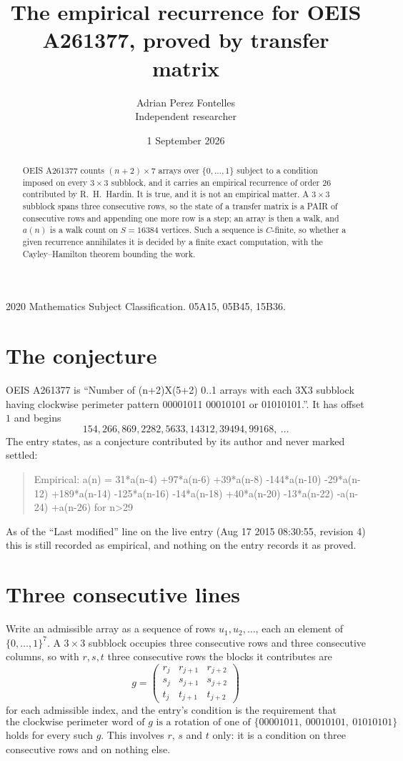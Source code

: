 \documentclass[11pt,a4paper]{article}
\title{The empirical recurrence for OEIS A261377, proved by transfer matrix}
\author{Adrian Perez Fontelles\\ \small Independent researcher}
\date{1 September 2026}
\theoremstyle{plain}
\theoremstyle{definition}
\begin{document}
\maketitle

\begin{abstract}
OEIS A261377 counts $(n+2)\times7$ arrays over $\{0,\dots,1\}$ subject to a condition imposed on
every $3\times3$ subblock, and it carries an empirical recurrence of order $26$
contributed by R.~H.~Hardin. It is true, and it is not an empirical matter. A $3\times3$
subblock spans three consecutive rows, so the state of a transfer matrix is a PAIR of
consecutive rows and appending one more row is a step; an array is then a walk, and
$a(n)$ is a walk count on $S=16384$ vertices. Such a sequence is $C$-finite, so whether a given
recurrence annihilates it is decided by a finite exact computation, with the Cayley--Hamilton
theorem bounding the work.
\end{abstract}

\noindent\small 2020 Mathematics Subject Classification. 05A15, 05B45, 15B36.\normalsize

\section{The conjecture}

OEIS A261377 is ``Number of (n+2)X(5+2) 0..1 arrays with each 3X3 subblock having clockwise perimeter pattern 00001011 00010101 or 01010101.''. It has offset $1$ and begins
\[
154, 266, 869, 2282, 5633, 14312, 39494, 99168,\ \dots
\]
The entry states, as a conjecture contributed by its author and never marked settled:
\begin{quote}
Empirical: a(n) = 31*a(n-4) +97*a(n-6) +39*a(n-8) -144*a(n-10) -29*a(n-12) +189*a(n-14) -125*a(n-16) -14*a(n-18) +40*a(n-20) -13*a(n-22) -a(n-24) +a(n-26) for n>29
\end{quote}
As of the ``Last modified'' line on the live entry (Aug 17 2015 08:30:55, revision 4) this is still
recorded as empirical, and nothing on the entry records it as proved.

\section{Three consecutive lines}

Write an admissible array as a sequence of rows $u_1,u_2,\dots$, each an element of
$\{0,\dots,1\}^{7}$. A $3\times3$ subblock occupies three consecutive rows and
three consecutive columns, so with $r,s,t$ three consecutive rows the blocks it
contributes are
\[
g=\begin{pmatrix}r_j&r_{j+1}&r_{j+2}\\ s_j&s_{j+1}&s_{j+2}\\ t_j&t_{j+1}&t_{j+2}\end{pmatrix}
\]
for each admissible index, and the entry's condition is the requirement that
\[
\text{the clockwise perimeter word of }g\text{ is a rotation of one of }\{00001011,\ 00010101,\ 01010101\}
\]
holds for every such $g$. This involves $r$, $s$ and $t$ only: it is a condition on
three consecutive rows and on nothing else.
\end{document}
